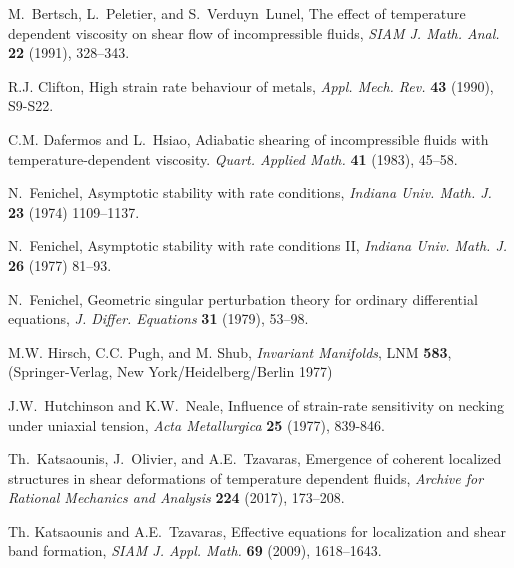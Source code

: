 \documentclass[a4paper,11pt]{article}
\theoremstyle{remark}
\begin{document}
\vfil\eject
\begin{thebibliography}{10}

{\sc M.~Bertsch, L.~Peletier, and S.~Verduyn~Lunel},
The effect of temperature dependent viscosity on shear flow of  incompressible fluids,
{\it SIAM J. Math. Anal.} {\bf 22 } (1991), 328--343.

{\sc R.J. Clifton},  High strain rate behaviour of metals,
{\it Appl. Mech. Rev.}
{\bf 43} (1990), S9-S22.

{\sc C.M. Dafermos and L.~Hsiao},
Adiabatic shearing of incompressible fluids with temperature-dependent viscosity.
{\it Quart.  Applied Math.} {\bf 41} (1983), 45--58.


{\sc N.~Fenichel},
Asymptotic stability with rate conditions,
{\it Indiana Univ. Math. J.} {\bf 23} (1974) 1109--1137.

{\sc N.~Fenichel},
Asymptotic stability with rate conditions \textrm{II},
{\it Indiana Univ. Math. J.} {\bf 26} (1977) 81--93.

{\sc N.~Fenichel},
Geometric singular perturbation theory for ordinary differential equations,
{\it J. Differ. Equations} {\bf 31} (1979), 53--98.


{\sc M.W. Hirsch, C.C. Pugh, and M. Shub},
{\it Invariant Manifolds}, LNM {\bf 583}, (Springer-Verlag, New York/Heidelberg/Berlin 1977)

{\sc J.W.~Hutchinson and K.W.~Neale},
Influence of strain-rate sensitivity on necking under uniaxial tension,
{\it  Acta Metallurgica} {\bf 25} (1977), 839-846.

{\sc Th.~Katsaounis, J.~Olivier, and A.E.~Tzavaras},
Emergence of coherent localized structures in shear deformations of temperature dependent fluids,
{\it Archive for Rational Mechanics and Analysis} {\bf 224} (2017), 173--208.

{\sc Th. Katsaounis and A.E.~Tzavaras},
Effective equations for localization and shear band formation,
{\it SIAM J. Appl. Math.}  {\bf 69} (2009), 1618--1643.


\end{thebibliography}
\end{document}
